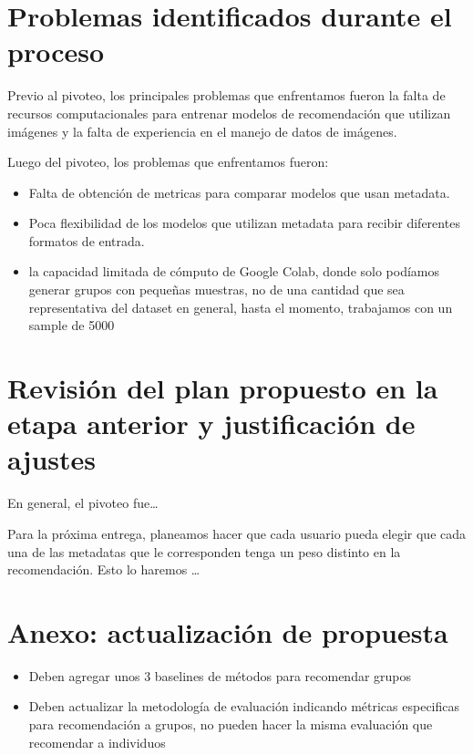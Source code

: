 \documentclass[11pt]{article}
\begin{document}
\section{Problemas identificados durante el proceso} 

Previo al pivoteo, los principales problemas que enfrentamos fueron la falta de recursos computacionales para entrenar modelos de recomendación que utilizan imágenes y la falta de experiencia en el manejo de datos de imágenes. %

Luego del pivoteo, los problemas que enfrentamos fueron:
\begin{itemize}
    \item Falta de obtención de metricas para comparar modelos que usan metadata.
    \item Poca flexibilidad de los modelos que utilizan metadata para recibir diferentes formatos de entrada.
    \item la capacidad limitada de cómputo de Google Colab, donde solo podíamos generar grupos con pequeñas muestras, no de una cantidad que sea representativa del dataset en general, hasta el momento, trabajamos con un sample de 5000
\end{itemize}

\section{Revisión del plan propuesto en la etapa anterior y justificación de ajustes} 

En general, el pivoteo fue\dots %

Para la próxima entrega, planeamos hacer que cada usuario pueda elegir que cada una de las metadatas que le corresponden tenga un peso distinto en la recomendación. Esto lo haremos \dots %

\section{Anexo: actualización de propuesta}
\begin{itemize}
    \item Deben agregar unos 3 baselines de métodos para recomendar grupos
    \item Deben actualizar la metodología de evaluación indicando métricas especificas para recomendación a grupos, no pueden hacer la misma evaluación que recomendar a individuos
\end{itemize}
\end{document}
